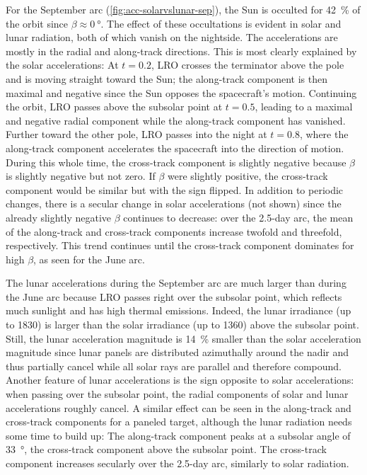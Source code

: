 For the September arc (\cref{fig:acc-solarvslunar-sep}), the Sun is occulted for \qty{42}{\percent} of the orbit since $\beta \approx \qty{0}{\degree}$. The effect of these occultations is evident in solar and lunar radiation, both of which vanish on the nightside. The accelerations are mostly in the radial and along-track directions. This is most clearly explained by the solar accelerations: At $t=\num{0.2}$, \gls{LRO} crosses the terminator above the pole and is moving straight toward the Sun; the along-track component is then maximal and negative since the Sun opposes the spacecraft's motion. Continuing the orbit, \gls{LRO} passes above the subsolar point at $t=\num{0.5}$, leading to a maximal and negative radial component while the along-track component has vanished. Further toward the other pole, \gls{LRO} passes into the night at $t=\num{0.8}$, where the along-track component accelerates the spacecraft into the direction of motion. During this whole time, the cross-track component is slightly negative because $\beta$ is slightly negative but not zero. If $\beta$ were slightly positive, the cross-track component would be similar but with the sign flipped. In addition to periodic changes, there is a secular change in solar accelerations (not shown) since the already slightly negative $\beta$ continues to decrease: over the 2.5-day arc, the mean of the along-track and cross-track components increase twofold and threefold, respectively. This trend continues until the cross-track component dominates for high $\beta$, as seen for the June arc.

The lunar accelerations during the September arc are much larger than during the June arc because \gls{LRO} passes right over the subsolar point, which reflects much sunlight and has high thermal emissions. Indeed, the lunar irradiance (up to \qty{1830}{\irr}) is larger than the solar irradiance (up to \qty{1360}{\irr}) above the subsolar point. Still, the lunar acceleration magnitude is \qty{14}{\percent} smaller than the solar acceleration magnitude since lunar panels are distributed azimuthally around the nadir and thus partially cancel while all solar rays are parallel and therefore compound. Another feature of lunar accelerations is the sign opposite to solar accelerations: when passing over the subsolar point, the radial components of solar and lunar accelerations roughly cancel. A similar effect can be seen in the along-track and cross-track components for a paneled target, although the lunar radiation needs some time to build up: The along-track component peaks at a subsolar angle of \qty{33}{\degree}, the cross-track component above the subsolar point. The cross-track component increases secularly over the 2.5-day arc, similarly to solar radiation.

